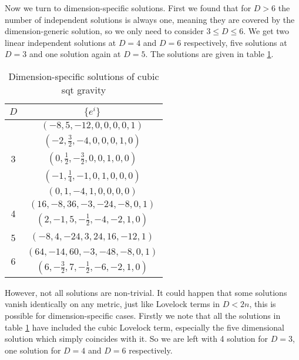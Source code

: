 \documentclass[a4paper,11pt]{article}
\begin{document}
Now we turn to dimension-specific solutions. First we found that for $D > 6$ the number of independent solutions is always one, meaning they are covered by the dimension-generic solution, so we only need to consider $3 \leqslant D \leqslant 6$. We get two linear independent solutions at $D=4$ and $D=6$ respectively, five solutions at $D=3$ and one solution again at $D=5$. The solutions are given in table \ref{tab:cubic-qtg-dimspec-sols}.
\begin{table}[t!]
    \centering
    \begin{tabular}{|c|c|}
        \hline
        $D$ & $\{e^i\}$ \\
        \hline
        \multirow{5}{*}{3}
        & $(-8,5,-12,0,0,0,0,1)$ \\
        & $(-2,\frac{3}{2},-4,0,0,0,1,0)$ \\
        & $(0,\frac{1}{2},-\frac{3}{2},0,0,1,0,0)$ \\
        & $(-1, \frac14, -1, 0, 1, 0, 0, 0)$ \\
        & $(0, 1, -4, 1, 0, 0, 0, 0)$ \\
        \hline
        \multirow{2}{*}{4}
        & $(16,-8,36,-3,-24,-8,0,1)$ \\
        & $(2,-1,5,-\frac{1}{2},-4,-2,1,0)$ \\
        \hline
        5 & $(-8,4,-24,3,24,16,-12,1)$ \\
        \hline
        \multirow{2}{*}{6}
        & $(64,-14,60,-3,-48,-8,0,1)$ \\
        & $(6,-\frac{3}{2},7,-\frac{1}{2},-6,-2,1,0)$\\
        \hline
    \end{tabular}
    \caption{Dimension-specific solutions of cubic \ac{sqt} gravity}
    \label{tab:cubic-qtg-dimspec-sols}
\end{table}
However, not all solutions are non-trivial. It could happen that some solutions vanish identically on any metric, just like Lovelock terms in $D < 2n$, this is possible for dimension-specific cases.  Firstly we note that all the solutions in table \ref{tab:cubic-qtg-dimspec-sols} have included the cubic Lovelock term, especially the five dimensional solution which simply coincides with it. So we are left with 4 solution for $D = 3$, one solution for $D = 4$ and $D = 6$ respectively.
\end{document}
